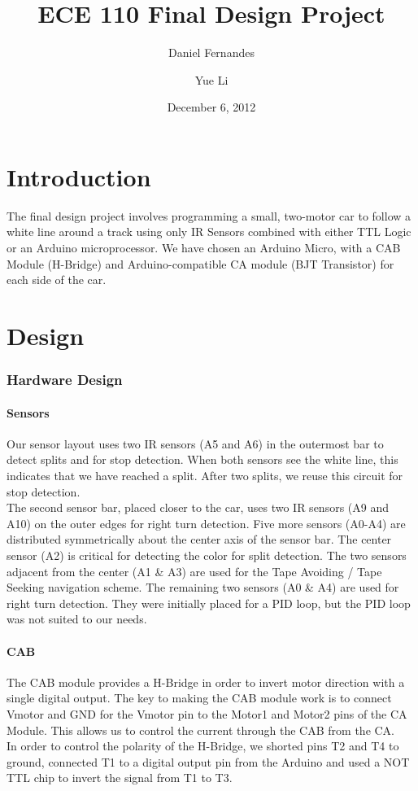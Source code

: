 \documentclass{article}
\author{Daniel Fernandes \and Yue Li}
\title{ECE 110 Final Design Project}
\date{December 6, 2012}
\begin{document}
\maketitle

\part{Introduction}
The final design project involves programming a small, two-motor car to follow a white line around a track using only IR Sensors combined with either TTL Logic or an Arduino microprocessor. We have chosen an Arduino Micro, with a CAB Module (H-Bridge) and Arduino-compatible CA module (BJT Transistor) for each side of the car.
\part{Design}
\section{Hardware Design}
\subsection{Sensors}
Our sensor layout uses two IR sensors (A5 and A6) in the outermost bar to detect splits and for stop detection. When both sensors see the white line, this indicates that we have reached a split. After two splits, we reuse this circuit for stop detection.\\
The second sensor bar, placed closer to the car, uses two IR sensors (A9 and A10) on the outer edges for right turn detection. Five more sensors (A0-A4) are distributed symmetrically about the center axis of the sensor bar. The center sensor (A2) is critical for detecting the color for split detection. The two sensors adjacent from the center (A1 \& A3) are used for the Tape Avoiding / Tape Seeking navigation scheme. The remaining two sensors (A0 \& A4) are used for right turn detection. They were initially placed for a PID loop, but the PID loop was not suited to our needs.
\subsection{CAB}
The CAB module provides a H-Bridge in order to invert motor direction with a single digital output. The key to making the CAB module work is to connect Vmotor and GND for the Vmotor pin to the Motor1 and Motor2 pins of the CA Module. This allows us to control the current through the CAB from the CA.\\
In order to control the polarity of the H-Bridge, we shorted pins T2 and T4 to ground, connected T1 to a digital output pin from the Arduino and used a NOT TTL chip to invert the signal from T1 to T3.
\end{document}
